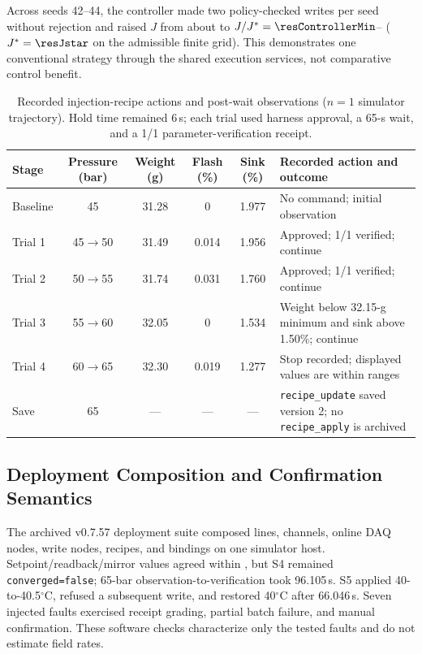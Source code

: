 Across seeds 42--44, the controller made two policy-checked writes per seed
without rejection and raised $J$ from about \resJzero{} to
$J/J^*=\resControllerMin$--\resControllerMax{} ($J^*=\resJstar$ on the
admissible finite grid). This demonstrates one conventional strategy through
the shared execution services, not comparative control benefit.

\begin{table}[!t]
\centering
\caption{Recorded injection-recipe actions and post-wait observations
($n=1$ simulator trajectory). Hold time remained 6\,s; each trial used
harness approval, a 65-s wait, and a 1/1 parameter-verification receipt.}
\label{tab:q6actions}
\footnotesize
\setlength{\tabcolsep}{3.5pt}
\begin{tabularx}{\textwidth}{@{}l c c c c X@{}}
\toprule
Stage & Pressure (bar) & Weight (g) & Flash (\%) & Sink (\%) & Recorded action and outcome \\
\midrule
Baseline & 45 & 31.28 & 0 & 1.977 & No command; initial observation \\
Trial 1 & 45$\rightarrow$50 & 31.49 & 0.014 & 1.956 & Approved; 1/1 verified; continue \\
Trial 2 & 50$\rightarrow$55 & 31.74 & 0.031 & 1.760 & Approved; 1/1 verified; continue \\
Trial 3 & 55$\rightarrow$60 & 32.05 & 0 & 1.534 & Weight below 32.15-g minimum and sink above 1.50\%; continue \\
Trial 4 & 60$\rightarrow$65 & 32.30 & 0.019 & 1.277 & Stop recorded; displayed values are within ranges \\
Save & 65 & --- & --- & --- & \texttt{recipe\_update} saved version 2; no \texttt{recipe\_apply} is archived \\
\bottomrule
\end{tabularx}
\end{table}

\subsection{Deployment Composition and Confirmation Semantics}
\label{sec:hardening}
The archived v0.7.57 deployment suite composed \resLinesLive{} lines,
\resChannelsLive{} channels, \resDaqOnline{} online DAQ nodes,
\resWriteNodesLive{} write nodes, \resRecipesLive{} recipes, and
\resBindingsLive{} bindings on one simulator host. Setpoint/readback/mirror
values agreed within \resConsistencyErr{}, but S4 remained
\texttt{converged=false}; 65-bar observation-to-verification took 96.105\,s.
S5 applied 40-to-40.5$^{\circ}$C, refused a subsequent write, and restored
40$^{\circ}$C after 66.046\,s. Seven injected faults exercised receipt
grading, partial batch failure, and manual confirmation. These software
checks characterize only the tested faults and do not estimate field rates.

